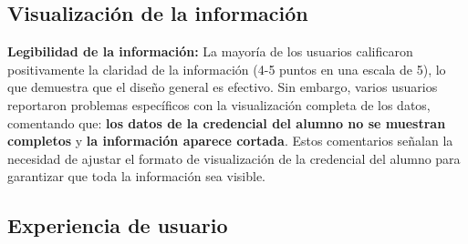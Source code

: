 \subsection{Visualización de la información}
\textbf{Legibilidad de la información:}  
La mayoría de los usuarios calificaron positivamente la claridad de la información (4-5 puntos en una escala de 5), lo que demuestra que el diseño general es efectivo.  
Sin embargo, varios usuarios reportaron problemas específicos con la visualización completa de los datos, comentando que: \textbf{los datos de la credencial del alumno no se muestran completos} y \textbf{la información aparece cortada}. Estos comentarios señalan la necesidad de ajustar el formato de visualización de la credencial del alumno para garantizar que toda la información sea visible.

\subsection{Experiencia de usuario}

